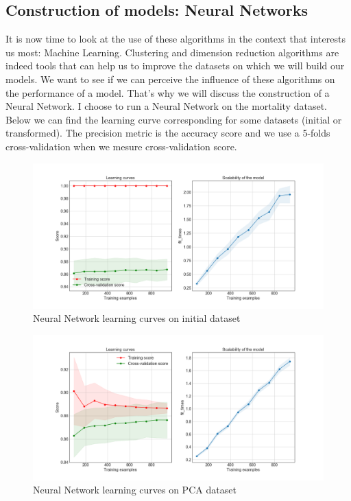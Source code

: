 \documentclass[15pt]{article}
\begin{document}
\begin{multicols}{2}
\section{Construction of models: Neural Networks}

It is now time to look at the use of these algorithms in the context that interests us most: Machine Learning. Clustering and dimension reduction algorithms are indeed tools that can help us to improve the datasets on which we will build our models. We want to see if we can perceive the influence of these algorithms on the performance of a model. That's why we will discuss the construction of a Neural Network. I choose to run a Neural Network on the mortality dataset. Below we can find the learning curve corresponding for some datasets (initial or transformed). The precision metric is the accuracy score and we use a 5-folds cross-validation when we mesure cross-validation score.

\begin{figure}[H]
\centering
\includegraphics[width = \columnwidth]{NNC2.png}
\caption{Neural Network learning curves on initial dataset}
\end{figure}

\begin{figure}[H]
\centering
\includegraphics[width = \columnwidth]{NNCpca.png}
\caption{Neural Network learning curves on PCA dataset}
\end{figure}


\end{multicols}
\end{document}
